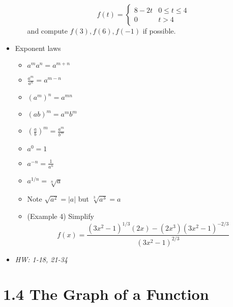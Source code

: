 \documentclass[11pt]{article}
\begin{document}
\begin{itemize}
\begin{itemize}
          \[ f(t) =
          \begin{cases}
            8-2t & 0\leq t\leq 4 \\
            0 & t>4
          \end{cases}
          \]
          and compute \(f(3),f(6),f(-1)\) if possible.
  \end{itemize}
\item Exponent laws
  \begin{itemize}
    \item \(a^ma^n=a^{m+n}\)
    \item \(\frac{a^m}{a^n}=a^{m-n}\)
    \item \((a^m)^n=a^{mn}\)
    \item \((ab)^m=a^mb^m\)
    \item \((\frac{a}{b})^m=\frac{a^m}{b^m}\)
    \item \(a^0=1\)
    \item \(a^{-n}=\frac{1}{a^n}\)
    \item \(a^{1/n}=\sqrt[n]{a}\)
    \item Note \(\sqrt{a^2}=|a|\) but \(\sqrt[3]{a^3}=a\)
    \item (Example 4) Simplify
          \[
            f(x)
              =
            \frac{
              (3x^2-1)^{1/3}(2x)-(2x^3)(3x^2-1)^{-2/3}
            }{
              (3x^2-1)^{2/3}
            }
          \]
  \end{itemize}
  \item\textit{
    HW: 1-18, 21-34
  }
\end{itemize}

\section*{1.4 The Graph of a Function}
\end{document}
